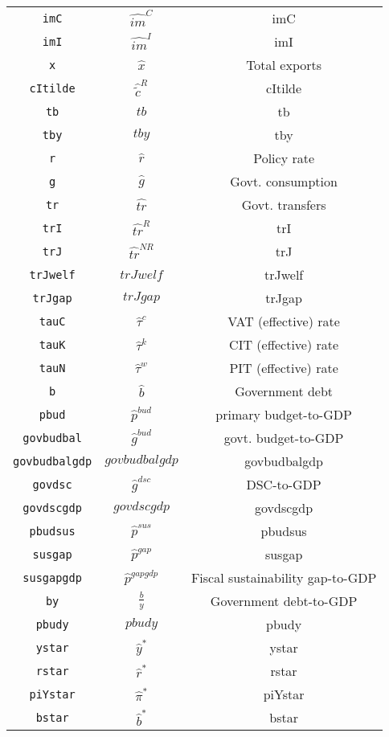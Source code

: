 \begin{center}
\begin{longtable}{ccc}
\texttt{imC} & $\hat{im}^C$ & imC\\
\texttt{imI} & $\hat{im}^I$ & imI\\
\texttt{x} & $\hat{x}$ & Total exports\\
\texttt{cItilde} & $\hat{\tilde{c}}^R$ & cItilde\\
\texttt{tb} & $tb$ & tb\\
\texttt{tby} & $tby$ & tby\\
\texttt{r} & $\hat{r}$ & Policy rate\\
\texttt{g} & $\hat{g}$ & Govt. consumption\\
\texttt{tr} & $\hat{tr}$ & Govt. transfers\\
\texttt{trI} & $\hat{tr}^R$ & trI\\
\texttt{trJ} & $\hat{tr}^{NR}$ & trJ\\
\texttt{trJwelf} & $trJwelf$ & trJwelf\\
\texttt{trJgap} & $trJgap$ & trJgap\\
\texttt{tauC} & $\hat{\tau}^c$ & VAT (effective) rate\\
\texttt{tauK} & $\hat{\tau}^k$ & CIT (effective) rate\\
\texttt{tauN} & $\hat{\tau}^w$ & PIT (effective) rate\\
\texttt{b} & $\hat{b}$ & Government debt\\
\texttt{pbud} & $\hat{p}^{bud}$ & primary budget-to-GDP\\
\texttt{govbudbal} & $\hat{g}^{bud}$ & govt. budget-to-GDP\\
\texttt{govbudbalgdp} & $govbudbalgdp$ & govbudbalgdp\\
\texttt{govdsc} & $\hat{g}^{dsc}$ & DSC-to-GDP\\
\texttt{govdscgdp} & $govdscgdp$ & govdscgdp\\
\texttt{pbudsus} & $\hat{p}^{sus}$ & pbudsus\\
\texttt{susgap} & $\hat{p}^{gap}$ & susgap\\
\texttt{susgapgdp} & $\hat{p}^{gapgdp}$ & Fiscal sustainability gap-to-GDP\\
\texttt{by} & $\frac{b}{y}$ & Government debt-to-GDP\\
\texttt{pbudy} & $pbudy$ & pbudy\\
\texttt{ystar} & $\hat{y}^*$ & ystar\\
\texttt{rstar} & $\hat{r}^*$ & rstar\\
\texttt{piYstar} & $\hat{\pi}^*$ & piYstar\\
\texttt{bstar} & $\hat{b}^*$ & bstar\\

\end{longtable}
\end{center}
